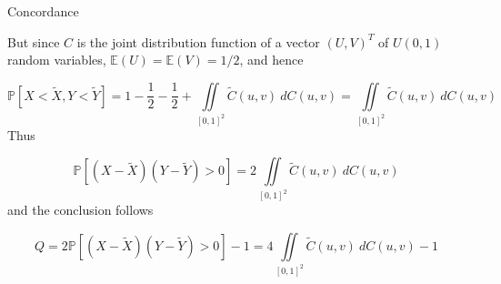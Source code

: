 \documentclass[11pt]{beamer}
\theoremstyle{plain}
\theoremstyle{definition}
\theoremstyle{remark}
\begin{document}
%
\begin{frame}{Concordance}
\footnotesize{
		But since $C$ is the joint distribution function of a vector $(U, V)^T$ of $U(0, 1)$ random variables, $\mathbb{E}(U) = 
		\mathbb{E}(V) = 1/2$, and hence
		
		\begin{equation}
		\mathbb{P}[X < \tilde X, Y < \tilde Y] = 1 - \frac{1}{2} - \frac{1}{2} + \iint\limits_{[0, 1]^2} \tilde C(u, v) \> dC(u, v) =
		\iint\limits_{[0, 1]^2} \tilde C(u, v) \> dC(u, v)
		\end{equation}
		Thus
		
		\begin{equation}
		\mathbb{P}[(X-\tilde X)(Y-\tilde Y) > 0] = 2 \iint\limits_{[0, 1]^2} \tilde C(u, v) \> dC(u, v)
		\end{equation}
		and the conclusion follows
		
		\begin{equation}
		Q = 2 \mathbb{P}[(X-\tilde X)(Y-\tilde Y) > 0] - 1 = 4 \iint\limits_{[0, 1]^2} \tilde C(u, v) \> dC(u, v) - 1
		\end{equation}
}
\end{frame}
%
\end{document}

